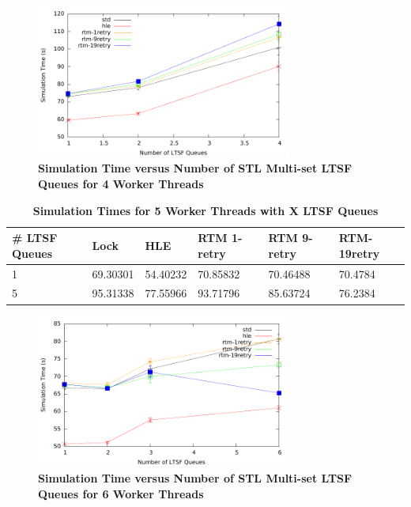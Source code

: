 \documentclass[11pt]{book}
\begin{document}
\begin{figure}[H]
    \centering
    \graphicspath{ {./figures/} }
    \includegraphics[width=0.75\textwidth,keepaspectratio]{xThrMig-hugeEpidemicSim-timeVSschedQs-multiset-4thread}
    \caption{\textbf{Simulation Time versus Number of STL Multi-set LTSF Queues
    for 4 Worker Threads}}
    \label{fig:xThrMig_timeVSschq_4threads}
\end{figure}

\begin{table}[H]
    \centering
    \begin{tabular}{l|p{2cm}|p{2cm}|p{2cm}|p{2cm}|p{2cm}}
        \textbf{\# LTSF Queues}&Lock &HLE &RTM 1-retry &RTM 9-retry &RTM-19retry \\
        \hline
        \midrule
            1 &69.30301  &54.40232 &70.85832  &70.46488 &70.4784 \\ 
            5 &95.31338  &77.55966 &93.71796  &85.63724 &76.2384 \\
    \end{tabular}
    \caption{\textbf{Simulation Times for 5 Worker Threads with X LTSF Queues}}
    \label{tab:xThrMig_5threadsXschq}
\end{table}

\begin{figure}[H]
    \centering
    \graphicspath{ {./figures/} }
    \includegraphics[width=0.75\textwidth,keepaspectratio]{xThrMig-hugeEpidemicSim-timeVSschedQs-multiset-6thread}
    \caption{\textbf{Simulation Time versus Number of STL Multi-set LTSF Queues
    for 6 Worker Threads}}
    \label{fig:xThrMig_timeVSschq_6threads}
\end{figure}
\end{document}
